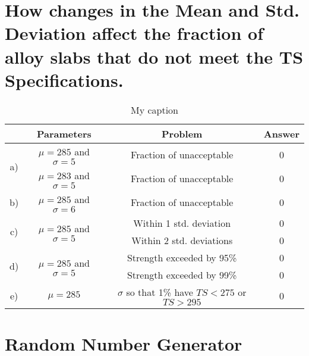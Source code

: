 \documentclass[letterpaper]{article}
\begin{document}
\section{How changes in the Mean and Std. Deviation affect the fraction of alloy slabs that do not meet the TS Specifications.} %

\begin{table}[H]
 \centering
 \begin{tabular}{c|c|c|c|}
                      & Parameters                                & Problem                                            & Answer \\ \hline
  \multirow{2}{*}{a)} & $\mu=285$ and $\sigma=5$                  & Fraction of unacceptable                           & 0      \\ \cline{2-4}
                      & $\mu=283$ and $\sigma=5$                  & Fraction of unacceptable                           & 0      \\ \hline
  b)                  & $\mu=285$ and $\sigma=6$                  & Fraction of unacceptable                           & 0      \\ \hline
  \multirow{2}{*}{c)} & \multirow{2}{*}{$\mu=285$ and $\sigma=5$} & Within 1 std. deviation                            & 0      \\ \cline{3-4}
                      &                                           & Within 2 std. deviations                           & 0      \\ \hline
  \multirow{2}{*}{d)} & \multirow{2}{*}{$\mu=285$ and $\sigma=5$} & Strength exceeded by 95\%                          & 0      \\ \cline{3-4}
                      &                                           & Strength exceeded by 99\%                          & 0      \\ \hline
  e)                  & $\mu=285$                                 & $\sigma$ so that 1\% have $TS < 275$ or $TS > 295$ & 0      \\ \hline
 \end{tabular}
 \caption{My caption}
 \label{my-label}
\end{table}

\section{Random Number Generator} %

\subsection{} %
\end{document}
